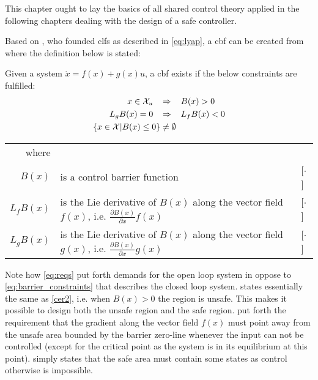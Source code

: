 This chapter ought to lay the basics of all shared control theory applied in the following chapters dealing with the design of a safe controller.

Based on \citep{bib:artstein}, who founded \glspl{clf} as described in \autoref{eq:lyap}, a \gls{cbf} can be created \citep{bib:org_control} from where the definition below is stated:
\begin{exa}
Given a system $\dot{x}=f(x)+g(x)u$, a \gls{cbf} exists if the below constraints are fulfilled:
\begin{subequations}\label{eq:reqs}
\begin{flalign}
x\in \mathcal{X}_u \hspace{0.3cm} &\Rightarrow \hspace{0.3cm} B(x) > 0  \label{req1} \\
L_gB(x) = 0 \hspace{0.3cm} &\Rightarrow \hspace{0.3cm} L_fB(x) < 0 \label{req2} \\
\{ x \in \mathcal{X} | B(x) \leq 0 \} &\neq \emptyset \label{req3}
\end{flalign}
\end{subequations}
\vspace{-0.6cm}
\begin{tabular}{r l l} 
where  & & \\
$B(x)$ & is a control barrier function & [$\cdot$] \\ 
$L_fB(x)$ & is the Lie derivative of $B(x)$ along the vector field  $f(x)$, i.e. $\frac{\partial B(x)}{\partial x}f(x)$ & [$\cdot$] \\ 
$L_gB(x)$ & is the Lie derivative of $B(x)$ along the vector field  $g(x)$, i.e. $\frac{\partial B(x)}{\partial x}g(x)$ & [$\cdot$] 
\end{tabular}
\vspace*{0.2cm}
\end{exa}
Note how \autoref{eq:reqs} put forth demands for the open loop system in oppose to \autoref{eq:barrier_constraints} that describes the closed loop system.  states essentially the same as \autoref{cer2}, i.e. when $B(x)>0$ the region is unsafe. This makes it possible to design both the unsafe region and the safe region.  put forth the requirement that the gradient along the vector field $f(x)$ must point away from the unsafe area bounded by the barrier zero-line whenever the input can not be controlled (except for the critical point as the system is in its equilibrium at this point).  simply states that the safe area must contain some states as control otherwise is impossible.
%
